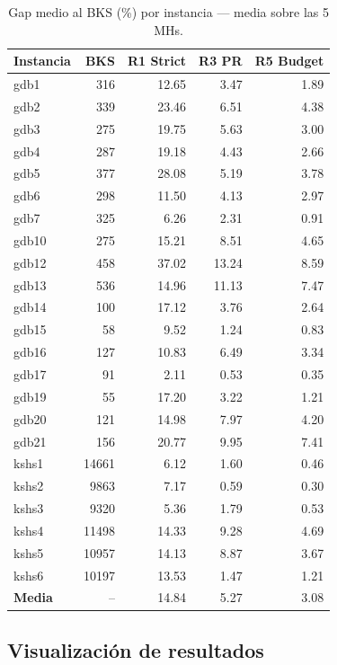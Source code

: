 \documentclass[11pt,a4paper]{article}
\theoremstyle{definition}
\theoremstyle{remark}
\begin{document}
\begin{table}[h]
\centering
\caption{Gap medio al BKS (\%) por instancia — media sobre las 5 MHs.}
\label{tab:re-greedy-inst}
\small
\begin{tabular}{lrrrr}
\toprule
Instancia & BKS & R1 Strict & R3 PR & R5 Budget \\
\midrule
gdb1  &  316 & 12.65 & 3.47 & 1.89 \\
gdb2  &  339 & 23.46 & 6.51 & 4.38 \\
gdb3  &  275 & 19.75 & 5.63 & 3.00 \\
gdb4  &  287 & 19.18 & 4.43 & 2.66 \\
gdb5  &  377 & 28.08 & 5.19 & 3.78 \\
gdb6  &  298 & 11.50 & 4.13 & 2.97 \\
gdb7  &  325 &  6.26 & 2.31 & 0.91 \\
gdb10 &  275 & 15.21 & 8.51 & 4.65 \\
gdb12 &  458 & 37.02 & 13.24 & 8.59 \\
gdb13 &  536 & 14.96 & 11.13 & 7.47 \\
gdb14 &  100 & 17.12 & 3.76 & 2.64 \\
gdb15 &   58 &  9.52 & 1.24 & 0.83 \\
gdb16 &  127 & 10.83 & 6.49 & 3.34 \\
gdb17 &   91 &  2.11 & 0.53 & 0.35 \\
gdb19 &   55 & 17.20 & 3.22 & 1.21 \\
gdb20 &  121 & 14.98 & 7.97 & 4.20 \\
gdb21 &  156 & 20.77 & 9.95 & 7.41 \\
kshs1 & 14661 & 6.12 & 1.60 & 0.46 \\
kshs2 &  9863 & 7.17 & 0.59 & 0.30 \\
kshs3 &  9320 & 5.36 & 1.79 & 0.53 \\
kshs4 & 11498 & 14.33 & 9.28 & 4.69 \\
kshs5 & 10957 & 14.13 & 8.87 & 3.67 \\
kshs6 & 10197 & 13.53 & 1.47 & 1.21 \\
\midrule
\textbf{Media} & -- & 14.84 & 5.27 & 3.08 \\
\bottomrule
\end{tabular}
\end{table}

\subsection{Visualización de resultados}
\label{subsec:viz-re-greedy}
\end{document}
